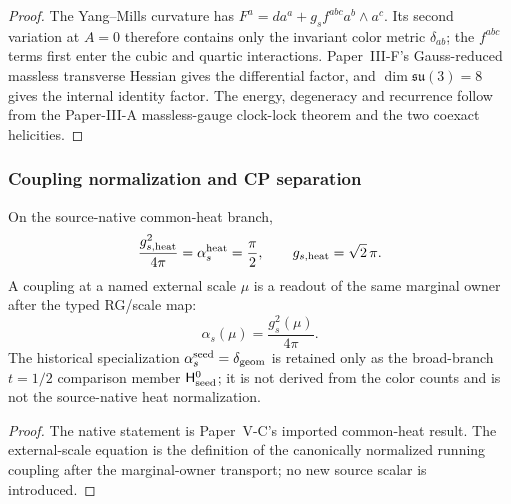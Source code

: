 \documentclass[12pt,a4paper]{article}
\providecommand{\deltageom}{\delta_{\rm geom}}
\providecommand{\alphasseed}{\alpha_s^{\rm seed}}
\providecommand{\Hseedzero}{\mathsf H_{\rm seed}^{0}}
\begin{document}
\begin{proof}
The Yang--Mills curvature has
\(F^a=da^a+g_sf^{abc}a^b\wedge a^c\).  Its second variation at \(A=0\)
therefore contains only the invariant color metric \(\delta_{ab}\); the
\(f^{abc}\) terms first enter the cubic and quartic interactions.  Paper~III-F's
Gauss-reduced massless transverse Hessian gives the differential factor, and
\(\dim\mathfrak{su}(3)=8\) gives the internal identity factor.  The energy,
degeneracy and recurrence follow from the Paper-III-A massless-gauge
clock-lock theorem and the two coexact helicities.
\end{proof}



\subsubsection{Coupling normalization and CP separation}
\label{p10:subsec:coupling-normalization-cp-separation}

\begin{proposition}
\label{p10:prop:strong-coupling-normalization}
On the source-native common-heat branch,
\begin{equation}
\label{p10:eq:gs-pivot}
 \frac{g_{s,\rm heat}^2}{4\pi}=\alpha_s^{\rm heat}=\frac\pi2,
 \qquad g_{s,\rm heat}=\sqrt2\,\pi.
\end{equation}
A coupling at a named external scale \(\mu\) is a readout of the same marginal
owner after the typed RG/scale map:
\[
 \alpha_s(\mu)=\frac{g_s^2(\mu)}{4\pi}.
\]
The historical specialization \(\alphasseed=\deltageom\) is retained only as
the broad-branch \(t=1/2\) comparison member \(\Hseedzero\); it is not derived
from the color counts and is not the source-native heat normalization.
\end{proposition}
\begin{proof}
The native statement is Paper~V-C's imported common-heat result.  The
external-scale equation is the definition of the canonically normalized
running coupling after the marginal-owner transport; no new source scalar is
introduced.
\end{proof}
\end{document}
